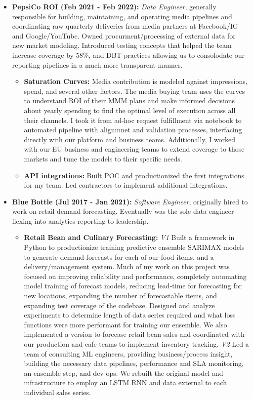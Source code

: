 \documentclass[a4paper,10pt,notitlepage]{article}
\begin{document}
    \begin{itemize}
        \vspace{-5pt}\item \textbf{PepsiCo ROI (Feb 2021 - Feb 2022):} \emph{Data Engineer}, generally responsible for building, maintaining, and operating media pipelines and coordinating raw quarterly deliveries from media partners at Facebook/IG and Google/YouTube. Owned procurment/processing of external data for new market modeling. Introduced testing concepts that helped the team increase coverage by 58\%, and DBT practices allowing us to consolodate our reporting pipelines in a much more transparent manner.
            \begin{itemize}
                    \item \textbf{Saturation Curves:} Media contribution is modeled against impressions, spend, and several other factors. The media buying team uses the curves to understand ROI of their MMM plans and make informed decisions about yearly spending to find the optimal level of execution across all their channels. I took it from ad-hoc request fulfillment via notebook to automated pipeline with alignmnet and validation processes, interfacing directly with our platform and business teams. Additionally, I worked with our EU business and engineering teams to extend coverage to those markets and tune the models to their specific needs.
                    \item \textbf{API integrations:} Built POC and productionized the first integrations for my team. Led contractors to implement additional integrations.
            \end{itemize}
        \vspace{-5pt}\item \textbf{Blue Bottle (Jul 2017 - Jan 2021):} \emph{Software Engineer}, originally hired to work on retail demand forecasting. Eventually was the sole data engineer flexing into analytics reporting to leadership.
            \begin{itemize}
                    \item \textbf{Retail Bean and Culinary Forecasting:} \emph{V1} Built a framework in Python to productionize training predictive ensemble SARIMAX models to generate demand forecasts for each of our food items, and a delivery/management system. Much of my work on this project was focused on improving reliability and performance, completely automating model training of forecast models, reducing lead-time for forecasting for new locations, expanding the number of forecastable items, and expanding test coverage of the codebase. Designed and analyze experiments to determine length of data series required and what loss functions were more performant for training our ensemble. We also implemented a version to forecase retail bean sales and coordinated with our production and cafe teams to implement inventory tracking. \emph{V2} Led a team of consulting ML engineers, providing business/process insight, building the necessary data pipelines, performance and SLA monitoring, an ensemble step, and dev ops. We rebuilt the original model and infrastructure to employ an LSTM RNN and data external to each individual sales series.

\end{itemize}
\end{itemize}
\end{document}
